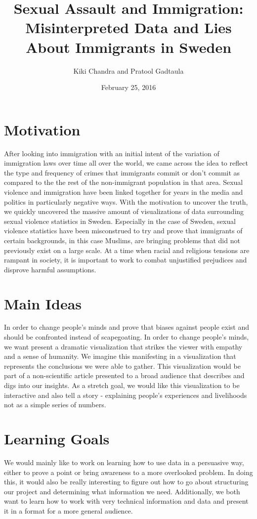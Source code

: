 \documentclass[10pt]{article}
\title{Sexual Assault and Immigration:\\
		\Large Misinterpreted Data and Lies\\
		\Large About Immigrants in Sweden}
\author{Kiki Chandra and Pratool Gadtaula}
\date{February 25, 2016}
\begin{document}
\maketitle

\section{Motivation}
	After looking into immigration with an initial intent of the variation of immigration laws over time all over the world, we came across the idea to reflect the type and frequency of crimes that immigrants commit or don’t commit as compared to the the rest of the non-immigrant population in that area. Sexual violence and immigration have been linked together for years in the media and politics in particularly negative ways. With the motivation to uncover the truth, we quickly uncovered the massive amount of visualizations of data surrounding sexual violence statistics in Sweden. Especially in the case of Sweden, sexual violence statistics have been misconstrued to try and prove that immigrants of certain backgrounds, in this case Muslims, are bringing problems that did not previously exist on a large scale. At a time when racial and religious tensions are rampant in society, it is important to work to combat unjustified prejudices and disprove harmful assumptions.
	
\section{Main Ideas}
	In order to change people’s minds and prove that biases against people exist and should be confronted instead of scapegoating. In order to change people’s minds, we want present a dramatic visualization that strikes the viewer with empathy and a sense of humanity. We imagine this manifesting in a visualization that represents the conclusions we were able to gather. This visualization would be part of a non-scientific article presented to a broad audience that describes and digs into our insights. As a stretch goal, we would like this visualization to be interactive and also tell a story - explaining people’s experiences and livelihoods not as a simple series of numbers.
	
\section{Learning Goals}
	We would mainly like to work on learning how to use data in a persuasive way, either to prove a point or bring awareness to a more overlooked problem. In doing this, it would also be really interesting to figure out how to go about structuring our project and determining what information we need. Additionally, we both want to learn how to work with very technical information and data and present it in a format for a more general audience.
\end{document}
